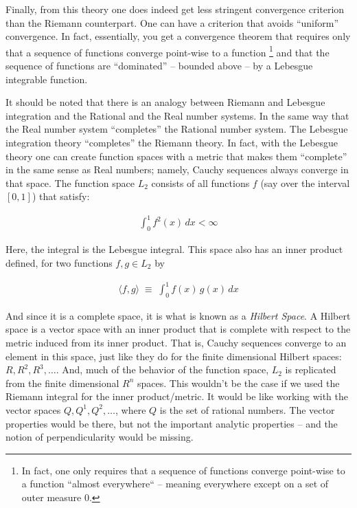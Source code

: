 \documentclass{article}
\begin{document}
Finally, from this theory one does indeed get less stringent convergence 
criterion than the Riemann counterpart. One can have a criterion that avoids 
``uniform'' convergence. In fact, essentially, you get a convergence theorem 
that requires only that a sequence of functions converge point-wise to a function%
\footnote{In fact, one only requires that a sequence of functions converge point-wise 
to a function ``almost everywhere`` -- meaning everywhere except on a set of 
outer measure $0$.} and that the sequence of functions 
are ``dominated'' -- bounded above -- by a Lebesgue integrable function.

It should be noted that there is an analogy between Riemann and Lebesgue integration 
and the Rational and the Real number systems. In the same way that the Real number 
system ``completes'' the Rational number system. The Lebesgue integration 
theory ``completes'' the Riemann theory. In fact, with the Lebesgue theory 
one can create function spaces with a metric that makes them ``complete'' 
in the same sense as Real numbers; namely, Cauchy sequences always converge 
in that space. The function space $L_2$ consists of all functions $f$ 
(say over the interval $[0,1]$) that satisfy:

\begin{eqnarray}
\int_0^1 f^2(x) \, dx < \infty
\end{eqnarray}

Here, the integral is the Lebesgue integral. This space also has an inner 
product defined, for two functions $f, g \in L_2$ by

\begin{eqnarray}
\langle f, g \rangle \; \equiv \; \int_0^1 f(x)\, g(x)\, dx
\end{eqnarray}

And since it is a complete space, it is what is known as a {\em Hilbert Space\/}.
A Hilbert space is a vector space with an inner product that is complete with 
respect to the metric induced from its inner product. 
That is, Cauchy sequences converge to an element in this
space, just like they do for the finite dimensional Hilbert spaces: $R, R^2, R^3, \ldots$.
And, much of the behavior of the function space, $L_2$ is replicated from 
the finite dimensional $R^n$ spaces. This wouldn't be the case if we used
the Riemann integral for the inner product/metric. It would be like
working with the vector spaces $Q, Q^1, Q^2, \ldots$, where $Q$ is the set 
of rational numbers. The vector properties would be there, but not 
the important analytic properties -- and the notion of perpendicularity would
be missing.
\end{document}
